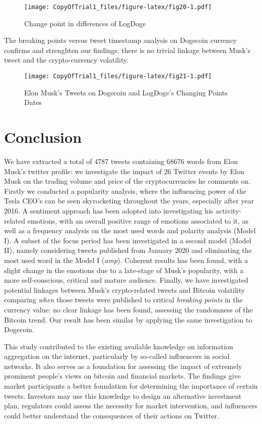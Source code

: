 \documentclass[
]{article}
\begin{document}
\begin{figure}
\centering
\texttt{[image: CopyOfTrial1\_files/figure-latex/fig20-1.pdf]}
\caption{\label{fig:fig20}Change point in differences of LogDoge}
\end{figure}

The breaking points versus tweet timestamp analysis on Dogecoin currency
confirms and strenghten our findings: there is no trivial linkage
between Musk's tweet and the crypto-currency volatility.

\begin{figure}
\centering
\texttt{[image: CopyOfTrial1\_files/figure-latex/fig21-1.pdf]}
\caption{\label{fig:fig21}Elon Musk's Tweets on Dogecoin and LogDoge's
Changing Points Dates}
\end{figure}

\hypertarget{conclusion}{%
\section{Conclusion}\label{conclusion}}

We have extracted a total of 4787 tweets containing 68676 words from
Elon Musk's twitter profile: we investigate the impact of 26 Twitter
events by Elon Musk on the trading volume and price of the
cryptocurrencies he comments on. Firstly we conducted a popularity
analysis, where the influencing power of the Tesla CEO's can be seen
skyrocketing throughout the years, especially after year 2016. A
sentiment approach has been adopted into investigating his
activity-related emotions, with an overall positive range of emotions
associated to it, as well as a frequency analysis on the most used words
and polarity analysis (Model I). A subset of the focus period has been
investigated in a second model (Model II), namely considering tweets
published from January 2020 and eliminating the most used word in the
Model I (\emph{amp}). Coherent results has been found, with a slight
change in the emotions due to a late-stage of Musk's popularity, with a
more self-conscious, critical and mature audience. Finally, we have
investigated potential linkages between Musk's crypto-related tweets and
Bitcoin volatility comparing \emph{when} those tweets were published to
critical \emph{breaking points} in the currency value: no clear linkage
has been found, assessing the randomness of the Bitcoin trend. Our
result has been similar by applying the same investigation to Dogecoin.

This study contributed to the existing available knowledge on
information aggregation on the internet, particularly by so-called
influencers in social networks. It also serves as a foundation for
assessing the impact of extremely prominent people's views on bitcoin
and financial markets. The findings give market participants a better
foundation for determining the importance of certain tweets. Investors
may use this knowledge to design an alternative investment plan,
regulators could assess the necessity for market intervention, and
influencers could better understand the consequences of their actions on
Twitter.
\end{document}
